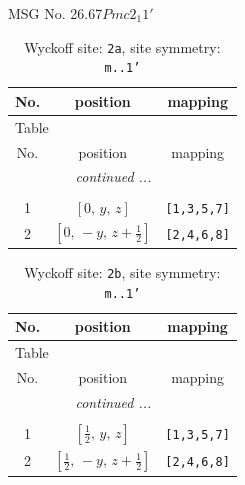 \documentclass[fleqn,8pt]{jsarticle}
\begin{document}
\setcounter{MaxMatrixCols}{32}

\renewcommand{\tablename}{Table~}
\renewcommand{\figurename}{Figure~}
\begin{center}
\LARGE
MSG No. 26.67\quad$Pmc2_{1}1'$
\end{center}
\renewcommand{\arraystretch}{1.2}
\begin{longtable}{ccc}
\caption{Wyckoff site: {\tt 2a}, site symmetry: {\tt m..1'}}
 \\
 \hline \hline
No. & position & mapping \\ \hline \endfirsthead

\multicolumn{2}{l}{\tablename\ \thetable{}} \\
 \hline \hline
No. & position & mapping \\ \hline \endhead

 \hline \hline
\multicolumn{2}{r}{\footnotesize\it continued ...} \\ \endfoot

 \hline \hline
\multicolumn{2}{r}{} \\ \endlastfoot

1 & $\left[ 0,\, y,\, z \right]$ & {\tt [1,3,5,7]} \\ \hline
2 & $\left[ 0,\, - y,\, z + \frac{1}{2} \right]$ & {\tt [2,4,6,8]} \\
\end{longtable}
\renewcommand{\arraystretch}{1.2}
\begin{longtable}{ccc}
\caption{Wyckoff site: {\tt 2b}, site symmetry: {\tt m..1'}}
 \\
 \hline \hline
No. & position & mapping \\ \hline \endfirsthead

\multicolumn{2}{l}{\tablename\ \thetable{}} \\
 \hline \hline
No. & position & mapping \\ \hline \endhead

 \hline \hline
\multicolumn{2}{r}{\footnotesize\it continued ...} \\ \endfoot

 \hline \hline
\multicolumn{2}{r}{} \\ \endlastfoot

1 & $\left[ \frac{1}{2},\, y,\, z \right]$ & {\tt [1,3,5,7]} \\ \hline
2 & $\left[ \frac{1}{2},\, - y,\, z + \frac{1}{2} \right]$ & {\tt [2,4,6,8]} \\
\end{longtable}
\end{document}
